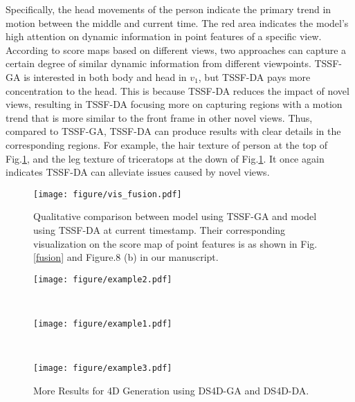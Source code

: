 Specifically, the head movements of the person indicate the primary trend in motion between the middle and current time. The red area indicates the model's high attention on dynamic information in point features of a specific view. According to score maps based on different views, two approaches can capture a certain degree of similar dynamic information from different viewpoints. TSSF-GA is interested in both body and head in $v_1$, but TSSF-DA pays more concentration to the head. This is because TSSF-DA reduces the impact of novel views, resulting in TSSF-DA focusing more on capturing regions with a motion trend that is more similar to the front frame in other novel views. Thus, compared to TSSF-GA, TSSF-DA can produce results with clear details in the corresponding regions. For example, the hair texture of person at the top of Fig.\ref{vis_fusion}, and the leg texture of triceratops at the down of Fig.\ref{vis_fusion}. It once again indicates TSSF-DA can alleviate issues caused by novel views.



\begin{figure}[h]%
\centering
\texttt{[image: figure/vis\_fusion.pdf]}
\caption{Qualitative comparison between model using TSSF-GA and model using TSSF-DA at current timestamp. Their corresponding visualization on the score map of point features is as shown in Fig.\ref{fusion} and Figure.8 (b) in our manuscript.}\label{vis_fusion}
\end{figure}

\begin{figure*}[]
    \centering
	\begin{minipage}{0.75\linewidth}
        \centerline{\texttt{[image: figure/example2.pdf]}}
	\end{minipage}
	\\ \vspace{0.5mm}
	\begin{minipage}{0.75\linewidth}
        \centerline{\texttt{[image: figure/example1.pdf]}}
	\end{minipage}
	\\ \vspace{0.5mm}
	\begin{minipage}{0.75\linewidth}
        \centerline{\texttt{[image: figure/example3.pdf]}}
	\end{minipage}
	\caption{More Results for 4D Generation using DS4D-GA and DS4D-DA.}
\label{show_results}
\end{figure*}

